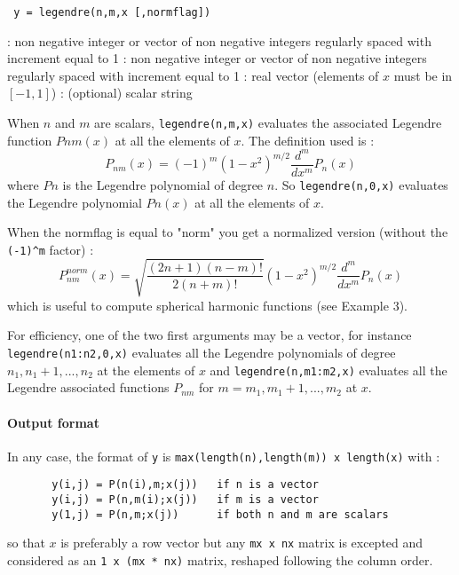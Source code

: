
\begin{mandesc}
\end{mandesc}

\begin{calling_sequence}
\begin{verbatim}
 y = legendre(n,m,x [,normflag]) 
\end{verbatim}
\end{calling_sequence}

\begin{parameters}
  \begin{varlist}
    : non negative integer or vector of non negative integers regularly spaced with increment equal to 1
    : non negative integer or vector of non negative integers regularly spaced with increment equal to 1
    : real vector (elements of $x$ must be in $[-1,1]$)
    : (optional) scalar string
  \end{varlist}
\end{parameters}

\begin{mandescription}
  When $n$ and $m$ are scalars, \verb!legendre(n,m,x)! evaluates the associated Legendre 
  function $Pnm(x)$ at all the elements of $x$. The definition used is :
$$  
P_{nm}(x) = (-1)^m \left(1 - x^2 \right)^{m/2} \frac{d^m}{dx^m} P_n (x)
$$
where $Pn$ is the Legendre polynomial of degree $n$. So 
\verb!legendre(n,0,x)! evaluates the Legendre polynomial $Pn(x)$ at all 
the elements of $x$. 
  
When the normflag is equal to "norm" you get a normalized version (without
the \verb!(-1)^m! factor) :
$$
 P_{nm}^{norm}(x) = \sqrt{\frac{(2n+1) (n-m)!}{2 (n+m)!}} \left(1 - x^2 \right)^{m/2} \frac{d^m}{dx^m} P_n (x)
$$
which is useful to compute spherical harmonic functions (see Example 3).
  
For efficiency, one of the two first arguments may be a vector, for instance
\verb!legendre(n1:n2,0,x)! evaluates all the Legendre polynomials of
degree $n_1, n_1+1, ..., n_2$ at the elements of $x$ and
\verb!legendre(n,m1:m2,x)! evaluates all the Legendre associated 
functions $P_{nm}$ for $m=m_1, m_1+1, ..., m_2$ at $x$.

\paragraph{Output format}

In any case, the format of \verb!y! is \verb+max(length(n),length(m)) x length(x)+
with :
\begin{verbatim}
       y(i,j) = P(n(i),m;x(j))   if n is a vector
       y(i,j) = P(n,m(i);x(j))   if m is a vector
       y(1,j) = P(n,m;x(j))      if both n and m are scalars
\end{verbatim}
so that $x$ is preferably a row vector but any \texttt{mx x nx} matrix
is excepted and considered as an \texttt{1 x (mx * nx)} matrix, reshaped
following the column order.
  
\end{mandescription}

